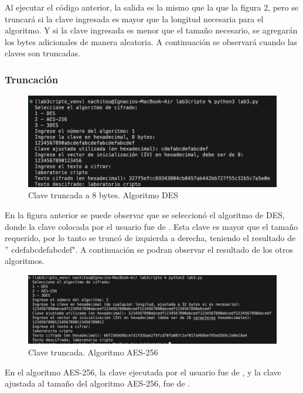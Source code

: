 \documentclass[letter,12pt]{article}
\begin{document}
Al ejecutar el código anterior, la salida es la mismo que la que la figura 2, pero se truncará si la clave ingresada es mayor que la longitud necesaria para el algoritmo. Y si la clave ingresada es menor que el tamaño necesario, se agregarán los bytes adicionales de manera aleatoria. A continuación se observará cuando las claves son truncadas.

\subsubsection{Truncación}


\begin{figure}[H]
    \centering
    \includegraphics[width=0.8\linewidth]{imagenes/truncar.jpg}
    \caption{Clave truncada a 8 bytes. Algoritmo DES}
    \label{fig:enter-label}
\end{figure}

En la figura anterior se puede observar que se seleccionó el algoritmo de DES, donde la clave colocada por el usuario fue de . Esta clave es mayor que el tamaño requerido, por lo tanto se truncó de izquierda a derecha, teniendo el resultado de '' cdefabcdefabcdef". A continuación se podran observar el resultado de los otros algoritmos.

\begin{figure}[H]
    \centering
    \includegraphics[width=1.0\linewidth]{imagenes/truncar aes.jpg}
    \caption{Clave truncada. Algoritmo AES-256}
    \label{fig:enter-label}
\end{figure}

En el algoritmo AES-256, la clave ejecutada por el usuario fue de , y la clave ajustada al tamaño del algoritmo AES-256, fue de .
\end{document}
